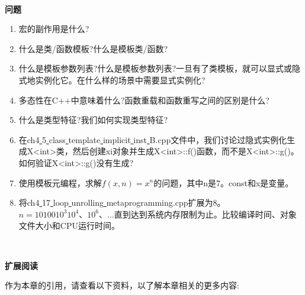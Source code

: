 \noindent\textbf{}\ \par
\textbf{问题} \ \par
\begin{enumerate}
	\item 宏的副作用是什么?
	\item 什么是类/函数模板?什么是模板类/函数?
	\item 什么是模板参数列表?什么是模板参数列表?一旦有了类模板，就可以显式或隐式地实例化它。在什么样的场景中需要显式实例化?
	\item 多态性在C++中意味着什么?函数重载和函数重写之间的区别是什么?
	\item 什么是类型特征?我们如何实现类型特征?
	\item 在ch4\underline{ }5\underline{ }class\underline{ }template\underline{ }implicit\underline{ }inst\underline{ }B.cpp文件中，我们讨论过隐式实例化生成X<int>类，然后创建xi对象并生成X<int>::f()函数，而不是X<int>::g()。如何验证X<int>::g()没有生成?
	\item 使用模板元编程，求解$f(x,n) = x^n$的问题，其中n是7。const和x是变量。
	\item 将ch4\underline{ }17\underline{ }loop\underline{ }unrolling\underline{ }metaprogramming.cpp扩展为8。$n = 10100 10 ^ 3 10 ^ 4、10 ^ 6、…$直到达到系统内存限制为止。比较编译时间、对象文件大小和CPU运行时间。
\end{enumerate}

\noindent\textbf{}\ \par
\textbf{扩展阅读} \ \par
作为本章的引用，请查看以下资料，以了解本章相关的更多内容: \par

